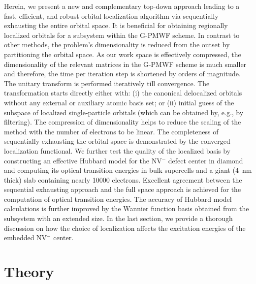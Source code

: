 \documentclass[journal=jacsat,manuscript=article]{achemso}
\begin{document}
Herein, we present a new and complementary top-down approach leading to a fast, efficient, and robust orbital localization algorithm via sequentially exhausting the entire orbital space. It is beneficial for obtaining regionally localized orbitals for a subsystem within the G-PMWF scheme. In contrast to other methods, the problem's dimensionality is reduced from the outset by partitioning the orbital space. As our work space is effectively compressed, the dimensionality of the relevant matrices in the G-PMWF scheme is much smaller and therefore, the time per iteration step is shortened by orders of magnitude. The unitary transform is performed iteratively till convergence. The transformation starts directly either with: (i) the canonical delocalized orbitals without any external or auxiliary atomic basis set\cite{Zhang2014,Clement2021}; or (ii) initial guess of the subspace of localized single-particle orbitals (which can be obtained by, e.g., by filtering\cite{Baer2013,Chen2019,Fabian2019,Baer2022,neuhauser2014breaking,Vlcek2018swift}). The compression of dimensionality helps to reduce the scaling of the method with the number of electrons to be linear. The completeness of sequentially exhausting the orbital space is demonstrated by the converged localization functional. We further test the quality of the localized basis by constructing an effective Hubbard model for the NV$^-$ defect center in diamond and computing its optical transition energies in bulk supercells and a giant (4~nm thick) slab containing nearly 10000 electrons. Excellent agreement between the sequential exhausting approach and the full space approach is achieved for the computation of optical transition energies. The accuracy of Hubbard model calculations is further improved by the Wannier function basis obtained from the subsystem with an extended size. In the last section, we provide a thorough discussion on how the choice of localization affects the excitation energies of the embedded NV$^-$ center.


\section{\label{sec:theory}Theory}
\end{document}
